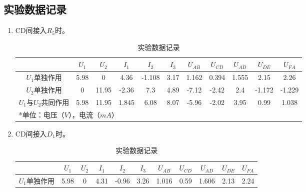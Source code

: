 \documentclass{../source/Experiment}
\begin{document}
        \subsection{实验数据记录}
            \begin{enumerate}
                \item CD间接入$R_5$时。
                \newpage
                \begin{table}[htbp]
                    \begin{center}
                        \caption{实验数据记录}
                        \begin{tabular}{|c|c|c|c|c|c|c|c|c|c|c|}
                            \hline    
                                {}{}& $U_1$ & $U_2$ & $I_1$ & $I_2$  & $I_3$ & $U_{AB}$ & $U_{CD}$ & $U_{AD}$ & $U_{DE}$ & $U_{FA}$ \\ \hline
                            $U_1$单独作用       & 5.98  & 0     & 4.36  & -1.108 & 3.17  & 1.162    & 0.394    & 1.555    & 2.15     & 2.26     \\ \hline
                            $U_2$单独作用       & 0     & 11.95 & -2.36 & 7.3    & 4.89  & -7.12    & -2.42    & 2.4      & -1.172   & -1.229   \\ \hline
                            $U_1$与$U_2$共同作用 & 5.98  & 11.95 & 1.845 & 6.08   & 8.07  & -5.96    & -2.02    & 3.95     & 0.99     & 1.038    \\ \hline
                            \multicolumn{11}{l}{*单位：电压（$V$），电流（$mA$）}                                                                      
                            \end{tabular}
                    \end{center}
                \end{table}
                \item CD间接入$D_1$时。
                \begin{table}[htbp]
                    \begin{center}
                        \caption{实验数据记录}
                        \begin{tabular}{|c|c|c|c|c|c|c|c|c|c|c|}
                            \hline
                                & $U_1$ & $U_2$ & $I_1$ & $I_2$ & $I_3$ & $U_{AB}$ & $U_{CD}$ & $U_{AD}$ & $U_{DE}$ & $U_{FA}$ \\ \hline
                            $U_1$单独作用       & 5.98  & 0     & 4.31  & -0.96 & 3.26  & 1.016    & 0.59     & 1.606    & 2.13     & 2.24     \\ \hline

\end{tabular}
\end{center}
\end{table}
\end{enumerate}
\end{document}
